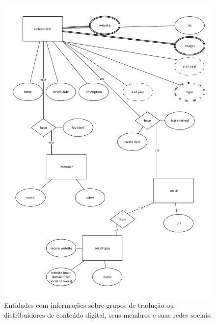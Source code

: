 \documentclass[12pt]{article}
\begin{document}
\begin{figure}[H]
\centering
\includegraphics[width=1\textwidth]{MER_-_Collaborator_Social.pdf}
\caption{Entidades com informações sobre grupos de tradução ou distribuidores de conteúdo digital, seus membros e suas redes sociais.} \label{collaborator}
\end{figure}
\end{document}
